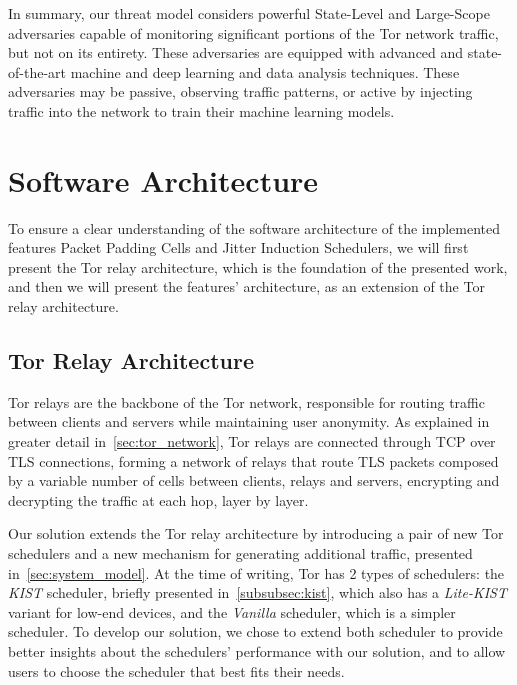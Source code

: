 In summary, our threat model considers powerful State-Level and Large-Scope adversaries capable of monitoring significant portions of the Tor network traffic, but not on its entirety. These adversaries are equipped with advanced and state-of-the-art machine and deep learning and data analysis techniques. These adversaries may be passive, observing traffic patterns, or active by injecting traffic into the network to train their machine learning models. 


\section{Software Architecture}\label{sec:software_architecture}

To ensure a clear understanding of the software architecture of the implemented features Packet Padding Cells and Jitter Induction Schedulers, we will first present the Tor relay architecture, which is the foundation of the presented work, and then we will present the features' architecture, as an extension of the Tor relay architecture.

\subsection{Tor Relay Architecture}\label{sec:tor_relay_architecture}
Tor relays are the backbone of the Tor network, responsible for routing traffic between clients and servers while maintaining user anonymity.  As explained in greater detail in~\autoref{sec:tor_network}, Tor relays are connected through TCP over TLS connections, forming a network of relays that route TLS packets composed by a variable number of cells between clients, relays and servers, encrypting and decrypting the traffic at each hop, layer by layer.

Our solution extends the Tor relay architecture by introducing a pair of new Tor schedulers and a new mechanism for generating additional traffic, presented in~\autoref{sec:system_model}. 
At the time of writing, Tor has 2 types of schedulers: the \textit{KIST} scheduler, briefly presented in~\autoref{subsubsec:kist}, which also has a \textit{Lite-KIST} variant for low-end devices, and the \textit{Vanilla} scheduler, which is a simpler scheduler. To develop our solution, we chose to extend both scheduler to provide better insights about the schedulers' performance with our solution, and to allow users to choose the scheduler that best fits their needs.

